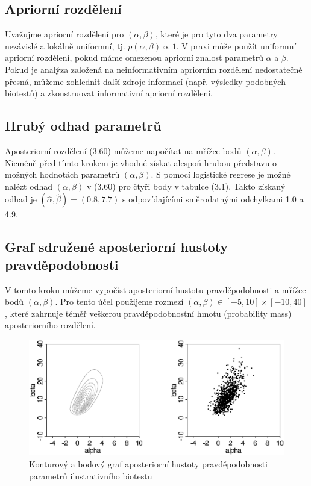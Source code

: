 \subsection{Apriorní rozdělení}

Uvažujme apriorní rozdělení pro $(\alpha, \beta)$, které je pro tyto dva parametry nezávislé a lokálně uniformní, tj. $p(\alpha, \beta) \varpropto 1$. V praxi může použít uniformní apriorní rozdělení, pokud máme omezenou  apriorní znalost parametrů $\alpha$ a $\beta$. Pokud je analýza založená na neinformativním apriorním rozdělení nedostatečně přesná, můžeme zohlednit další zdroje informací (např. výsledky podobných biotestů) a zkonstruovat informativní apriorní rozdělení.

\subsection{Hrubý odhad parametrů}

Aposteriorní rozdělení (3.60) můžeme napočítat na mřížce bodů $(\alpha, \beta)$. Nicméně před tímto krokem je vhodné získat alespoň hrubou představu o možných hodnotách parametrů $(\alpha, \beta)$. S pomocí logistické regrese je možné nalézt odhad $(\alpha, \beta)$ v (3.60) pro čtyři body v tabulce (3.1). Takto získaný odhad je $(\hat{\alpha}, \hat{\beta}) = (0.8, 7.7)$ s odpovídajícími směrodatnými odchylkami 1.0 a 4.9.

\subsection{Graf sdružené aposteriorní hustoty pravděpodobnosti}

V tomto kroku můžeme vypočíst aposteriorní hustotu pravděpodobnosti a mřížce bodů $(\alpha, \beta)$. Pro tento účel použijeme rozmezí $(\alpha, \beta) \in [-5, 10] \times [-10, 40]$, které zahrnuje téměř veškerou pravděpodobnostní hmotu (probability mass) aposteriorního rozdělení.
\begin{figure}[htp]
\centering
\includegraphics[scale = 0.35]{pictures/fig_3_3.eps}
\caption{Konturový a bodový graf aposteriorní hustoty pravděpodobnosti parametrů ilustrativního biotestu}
\label{fig_3_3}
\end{figure}

